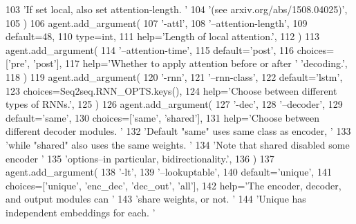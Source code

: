 \begin{DoxyCode}
103             \textcolor{stringliteral}{'If set local, also set attention-length. '}
104             \textcolor{stringliteral}{'(see arxiv.org/abs/1508.04025)'},
105         )
106         agent.add\_argument(
107             \textcolor{stringliteral}{'-attl'},
108             \textcolor{stringliteral}{'--attention-length'},
109             default=48,
110             type=int,
111             help=\textcolor{stringliteral}{'Length of local attention.'},
112         )
113         agent.add\_argument(
114             \textcolor{stringliteral}{'--attention-time'},
115             default=\textcolor{stringliteral}{'post'},
116             choices=[\textcolor{stringliteral}{'pre'}, \textcolor{stringliteral}{'post'}],
117             help=\textcolor{stringliteral}{'Whether to apply attention before or after '} \textcolor{stringliteral}{'decoding.'},
118         )
119         agent.add\_argument(
120             \textcolor{stringliteral}{'-rnn'},
121             \textcolor{stringliteral}{'--rnn-class'},
122             default=\textcolor{stringliteral}{'lstm'},
123             choices=Seq2seq.RNN\_OPTS.keys(),
124             help=\textcolor{stringliteral}{'Choose between different types of RNNs.'},
125         )
126         agent.add\_argument(
127             \textcolor{stringliteral}{'-dec'},
128             \textcolor{stringliteral}{'--decoder'},
129             default=\textcolor{stringliteral}{'same'},
130             choices=[\textcolor{stringliteral}{'same'}, \textcolor{stringliteral}{'shared'}],
131             help=\textcolor{stringliteral}{'Choose between different decoder modules. '}
132             \textcolor{stringliteral}{'Default "same" uses same class as encoder, '}
133             \textcolor{stringliteral}{'while "shared" also uses the same weights. '}
134             \textcolor{stringliteral}{'Note that shared disabled some encoder '}
135             \textcolor{stringliteral}{'options--in particular, bidirectionality.'},
136         )
137         agent.add\_argument(
138             \textcolor{stringliteral}{'-lt'},
139             \textcolor{stringliteral}{'--lookuptable'},
140             default=\textcolor{stringliteral}{'unique'},
141             choices=[\textcolor{stringliteral}{'unique'}, \textcolor{stringliteral}{'enc\_dec'}, \textcolor{stringliteral}{'dec\_out'}, \textcolor{stringliteral}{'all'}],
142             help=\textcolor{stringliteral}{'The encoder, decoder, and output modules can '}
143             \textcolor{stringliteral}{'share weights, or not. '}
144             \textcolor{stringliteral}{'Unique has independent embeddings for each. '}

\end{DoxyCode}
